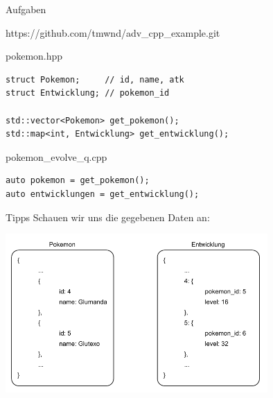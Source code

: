 \begin{frame}{Aufgaben}
    \begin{center}
        https://github.com/tmwnd/adv\_cpp\_example.git
    \end{center}
\end{frame}

\begin{frame}[fragile]{pokemon.hpp}
    \begin{verbatim}
struct Pokemon;     // id, name, atk
struct Entwicklung; // pokemon_id

std::vector<Pokemon> get_pokemon();
std::map<int, Entwicklung> get_entwicklung();
    \end{verbatim}
\end{frame}



\begin{frame}[fragile]{pokemon\_evolve\_q.cpp}
    \begin{verbatim}
auto pokemon = get_pokemon();
auto entwicklungen = get_entwicklung();
    \end{verbatim}
\end{frame}

\begin{frame}{Tipps}
    Schauen wir uns die gegebenen Daten an:

    \begin{center}
        \includegraphics[width=0.75\textwidth]{pictures/example_1.pdf}
    \end{center}
\end{frame}

